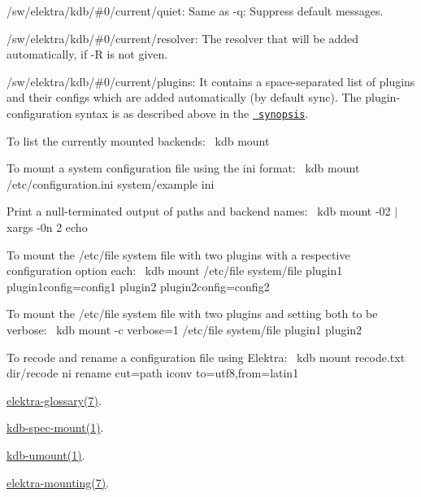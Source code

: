 \begin{DoxyItemize}
\item {\ttfamily /sw/elektra/kdb/\#0/current/quiet}\+: Same as {\ttfamily -\/q}\+: Suppress default messages.
\item {\ttfamily /sw/elektra/kdb/\#0/current/resolver}\+: The resolver that will be added automatically, if {\ttfamily -\/R} is not given.
\item {\ttfamily /sw/elektra/kdb/\#0/current/plugins}\+: It contains a space-\/separated list of plugins and their configs which are added automatically (by default sync). The plugin-\/configuration syntax is as described above in the \href{\#SYNOPSIS}{\texttt{ synopsis}}.
\end{DoxyItemize}

To list the currently mounted backends\+:~\newline
 {\ttfamily kdb mount}

To mount a system configuration file using the ini format\+:~\newline
 {\ttfamily kdb mount /etc/configuration.ini system/example ini}

Print a null-\/terminated output of paths and backend names\+:~\newline
 {\ttfamily kdb mount -\/02 $\vert$ xargs -\/0n 2 echo}

To mount the /etc/file system file with two plugins with a respective configuration option each\+:~\newline
 {\ttfamily kdb mount /etc/file system/file plugin1 plugin1config=config1 plugin2 plugin2config=config2}

To mount the /etc/file system file with two plugins and setting both to be verbose\+:~\newline
 {\ttfamily kdb mount -\/c verbose=1 /etc/file system/file plugin1 plugin2}

To recode and rename a configuration file using Elektra\+:~\newline
 {\ttfamily kdb mount recode.\+txt dir/recode ni rename cut=path iconv to=utf8,from=latin1}


\begin{DoxyItemize}
\item \mbox{\hyperlink{doc_help_elektra-glossary_md}{elektra-\/glossary(7)}}.
\item \mbox{\hyperlink{doc_help_kdb-spec-mount_md}{kdb-\/spec-\/mount(1)}}.
\item \mbox{\hyperlink{doc_help_kdb-umount_md}{kdb-\/umount(1)}}.
\item \mbox{\hyperlink{doc_help_elektra-mounting_md}{elektra-\/mounting(7)}}. 
\end{DoxyItemize}